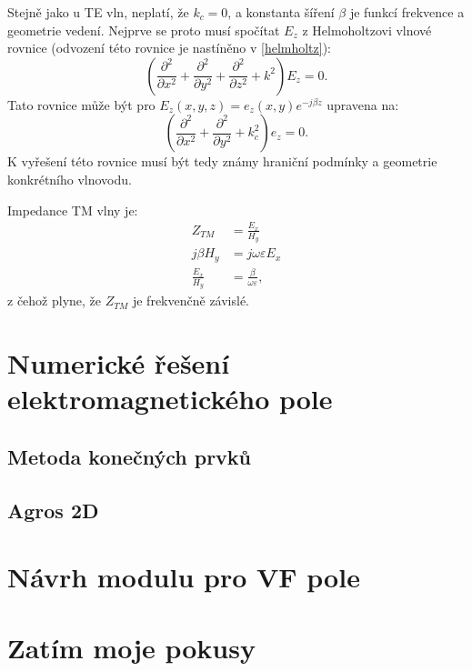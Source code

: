 \documentclass[12pt,a4paper,oneside]{article}
\numberwithin{equation}{section} %
\numberwithin{figure}{section} %
\numberwithin{table}{section} %
\begin{document}
Stejně jako u TE vln, neplatí, že $k_c = 0$, a konstanta šíření $\beta$ je funkcí frekvence a geometrie vedení. Nejprve se proto musí spočítat $E_z$ z Helmoholtzovi vlnové rovnice (odvození této rovnice je nastíněno v \ref{helmholtz}):
\begin{equation}
\left( \frac{\partial ^2}{\partial x^2} + \frac{\partial ^2}{\partial y^2} + \frac{\partial ^2}{\partial z^2} + k^2 \right) E_z = 0 .
\end{equation}
Tato rovnice může být pro $E_z(x,y,z) = e_z(x,y)e^{-j \beta z}$ upravena na:
\begin{equation}
\left( \frac{\partial ^2}{\partial x^2} + \frac{\partial ^2}{\partial y^2} + k^2_c \right) e_z = 0 .
\end{equation}
K vyřešení této rovnice musí být tedy známy hraniční podmínky a geometrie konkrétního vlnovodu.

Impedance TM vlny je:
\begin{subequations}
\begin{align}
Z_{TM} &= \frac{E_x}{H_y}
\\
j \beta H_y &= j \omega \varepsilon E_x
\\
\frac{E_x}{H_y} &= \frac{\beta}{\omega \varepsilon} ,
\end{align}
\end{subequations}
z čehož plyne, že $Z_{TM}$ je frekvenčně závislé.


\newpage
\section{Numerické řešení elektromagnetického pole}
\subsection{Metoda konečných prvků}
\subsection{Agros 2D}
\section{Návrh modulu pro VF pole}



\clearpage
\section{Zatím moje pokusy}
\end{document}
